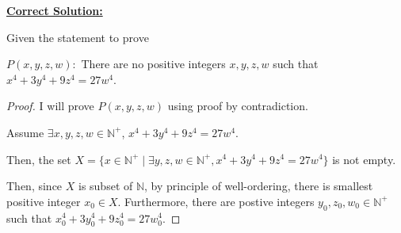 \documentclass[12pt]{article}
\begin{document}
\bigskip

\begin{mdframed}
    \underline{\textbf{Correct Solution:}}

    \bigskip

    Given the statement to prove

    \begin{center}
        $P(x,y,z,w):$ There are no positive integers $x,y,z,w$ such that $x^4 + 3y^4 + 9z^4 = 27w^4$.
    \end{center}

    \bigskip

    \begin{proof}
    I will prove $P(x,y,z,w)$ using proof by contradiction.

    \bigskip

    Assume $\exists x,y,z,w \in \mathbb{N}^+$, $x^4 + 3y^4 + 9z^4 = 27w^4$.

    \bigskip

    Then, the set $X = \{x \in \mathbb{N}^+ \mid \exists y,z,w \in \mathbb{N}^+, x^4 + 3y^4 + 9z^4 = 27w^4\}$ is
    not empty.

    \bigskip

    Then, \color{red}since $X$ is subset of $\mathbb{N}$\color{black}, by
    principle of well-ordering, there is smallest positive integer $x_0 \in X$.
    \color{red}Furthermore\color{black}, there are postive integers
    $y_0,z_0,w_0 \in \mathbb{N}^+$ such that $x_0^4 + 3y_0^4 + 9z_0^4 = 27w_0^4$.

    \bigskip


\end{proof}
\end{mdframed}
\end{document}
